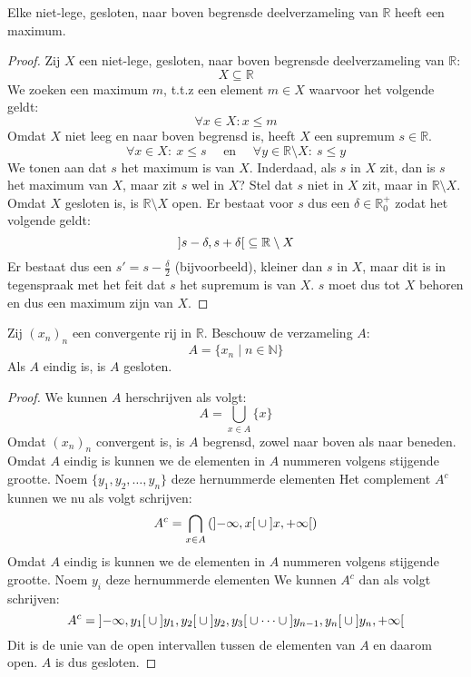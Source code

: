 \documentclass[main.tex]{subfiles}
\begin{document}
\begin{st}
  Elke niet-lege, gesloten, naar boven begrensde deelverzameling van $\mathbb{R}$ heeft een maximum.

  \begin{proof}
    Zij $X$ een niet-lege, gesloten, naar boven begrensde deelverzameling van $\mathbb{R}$:
    \[ X \subseteq \mathbb{R} \]
    We zoeken een maximum $m$, t.t.z een element $m\in X$ waarvoor het volgende geldt:
    \[ \forall x \in X: x \le m \]
    Omdat $X$ niet leeg en naar boven begrensd is, heeft $X$ een supremum $s\in \mathbb{R}$. 
    \[ \forall x\in X:\ x \le s \quad\text{ en }\quad \forall y \in \mathbb{R} \setminus X:\ s \le y \]
    We tonen aan dat $s$ het maximum is van $X$.
    Inderdaad, als $s$ in $X$ zit, dan is $s$ het maximum van $X$, maar zit $s$ wel in $X$?
    Stel dat $s$ niet in $X$ zit, maar in $\mathbb{R} \setminus X$.
    Omdat $X$ gesloten is, is $\mathbb{R} \setminus X$ open.
    Er bestaat voor $s$ dus een $\delta \in \mathbb{R}_{0}^{+}$ zodat het volgende geldt:
    \[ \interval[open]{s-\delta}{s+\delta} \subseteq \mathbb{R}\setminus X \]
    Er bestaat dus een $s'= s-\frac{\delta}{2}$ (bijvoorbeeld), kleiner dan $s$ in $X$, maar dit is in tegenspraak met het feit dat $s$ het supremum is van $X$.
    $s$ moet dus tot $X$ behoren en dus een maximum zijn van $X$.
  \end{proof}
\end{st}

\begin{st}
  Zij $(x_{n})_{n}$ een convergente rij in $\mathbb{R}$.
  Beschouw de verzameling $A$:
  \[ A = \{ x_{n} \mid n\in \mathbb{N} \} \]
  Als $A$ eindig is, is $A$ gesloten.
 
  \begin{proof}
    We kunnen $A$ herschrijven als volgt:
    \[ A = \bigcup_{x \in A}\{x\} \]
    Omdat $(x_{n})_{n}$ convergent is, is $A$ begrensd, zowel naar boven als naar beneden. 
    Omdat $A$ eindig is kunnen we de elementen in $A$ nummeren volgens stijgende grootte.
    Noem $\{y_{1},y_{2},\dotsc,y_{n}\}$ deze hernummerde elementen
    Het complement $A^{c}$ kunnen we nu als volgt schrijven:
    \[ A^{c} = \bigcap_{x\in A} \left( \interval[open]{-\infty}{x} \cup \interval[open]{x}{+\infty} \right) \]
    Omdat $A$ eindig is kunnen we de elementen in $A$ nummeren volgens stijgende grootte.
    Noem $y_{i}$ deze hernummerde elementen
    We kunnen $A^{c}$ dan als volgt schrijven:
    \[ A^{c} = \interval[open]{-\infty}{y_{1}} \cup \interval[open]{y_{1}}{y_{2}} \cup \interval[open]{y_{2}}{y_{3}} \cup \dotsb \cup \interval[open]{y_{n-1}}{y_{n}} \cup \interval[open]{y_{n}}{+\infty} \]
    Dit is de unie van de open intervallen tussen de elementen van $A$ en daarom open.
    $A$ is dus gesloten.
\feed
  \end{proof}
\end{st}
\end{document}
